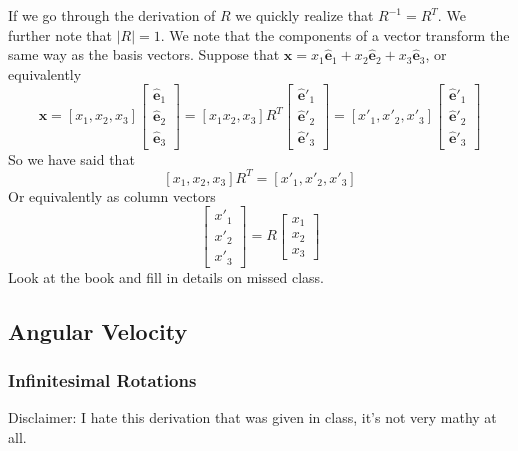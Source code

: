 \documentclass[a4paper]{article}
\begin{document}
If we go through the derivation of $R$ we quickly realize that $R^{-1} = R^T$. We further note that $|R| = 1$. We note that the components of a vector transform the same way as the basis vectors. Suppose that $\mathbf{x} = x_1\hat{\mathbf{e}}_1 + x_2\hat{\mathbf{e}}_2 + x_3\hat{\mathbf{e}}_3$, or equivalently
\[
    \mathbf{x} = [x_1, x_2, x_3]
    \begin{bmatrix}
        \hat{\mathbf{e}}_1 \\
        \hat{\mathbf{e}}_2 \\
        \hat{\mathbf{e}}_3
    \end{bmatrix}
    = [x_1 x_2, x_3]
    R^T
    \begin{bmatrix}
        \hat{\mathbf{e}}'_1 \\
        \hat{\mathbf{e}}'_2 \\
        \hat{\mathbf{e}}'_3
    \end{bmatrix}
    = [x'_1, x'_2, x'_3]
    \begin{bmatrix}
        \hat{\mathbf{e}}'_1 \\
        \hat{\mathbf{e}}'_2 \\
        \hat{\mathbf{e}}'_3
    \end{bmatrix}
\]
So we have said that
\[
    [x_1, x_2, x_3]R^T = 
    [x'_1, x'_2, x'_3]
\]
Or equivalently as column vectors
\[
    \begin{bmatrix}
        x'_1 \\
        x'_2 \\
        x'_3
    \end{bmatrix}
    = R
    \begin{bmatrix}
        x_1 \\
        x_2 \\
        x_3
    \end{bmatrix}
\]
Look at the book and fill in details on missed class.

\subsection*{Angular Velocity}%
\label{sub:Angular Velocity}

\subsubsection*{Infinitesimal Rotations}%
\label{ssub:Infinitesimal Rotations}
Disclaimer: I hate this derivation that was given in class, it's not very mathy at all. 
\end{document}
